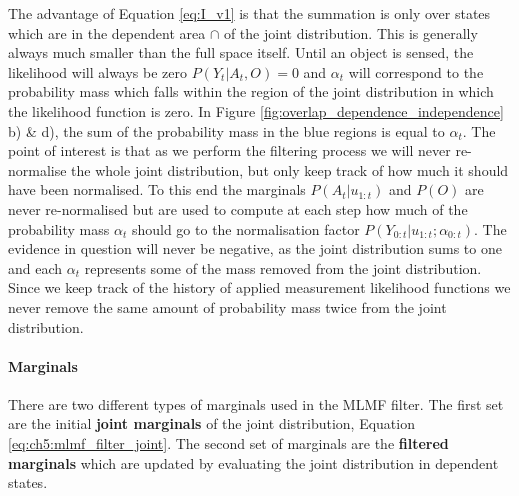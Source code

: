The advantage of Equation \ref{eq:I_v1} is that the summation is only over states which are in the dependent area $\cap$ of the joint 
distribution. This is generally always much smaller than the full space itself.
Until an object is sensed, the likelihood will always be zero $P(Y_t|A_t,O) = 0$ and $\alpha_t$ will correspond to the probability 
mass which falls within the region of the joint distribution in which the likelihood function is zero. In Figure 
\ref{fig:overlap_dependence_independence} b) \& d), the sum of the probability mass in the blue 
regions is equal to $\alpha_t$.
The point of interest is that as we perform the filtering process we will never re-normalise the whole joint distribution, but only keep 
track of how much it should have been normalised. To this end the marginals $P(A_t|u_{1:t})$ and $P(O)$  are never re-normalised but are used 
to compute at each step how much of the probability mass $\alpha_t$ should go to the normalisation factor $P(Y_{0:t}|u_{1:t};\alpha_{0:t})$. 
The evidence in question will never be negative, as the joint distribution sums to one and each $\alpha_t$ represents some of the mass removed from the joint distribution. Since we 
keep track of the history of applied  measurement likelihood functions we never remove the same amount of probability mass twice
from the joint distribution.

\paragraph{Marginals}

There are two different types of marginals used in the MLMF filter. The first set are the initial \textbf{joint marginals} of the joint distribution, Equation \ref{eq:ch5:mlmf_filter_joint}.
The second set of marginals are the \textbf{filtered marginals} which are updated by evaluating the joint distribution in dependent states.


\begin{center}
%
\end{center}

